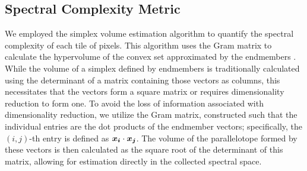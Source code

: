 \documentclass[conference,a4paper]{IEEEtran}
\newcommand{\vecb}[1]{\mbox{\boldmath$#1$}}%
\begin{document}


\subsection{Spectral Complexity Metric}
We employed the simplex volume estimation algorithm to quantify the spectral complexity of each tile of pixels. This algorithm uses the Gram matrix to calculate the hypervolume of the convex set approximated by the endmembers \cite{kostrikin_linear_1989, ziemann_using_2010, messinger_metrics_2012}. While the volume of a simplex defined by endmembers is traditionally calculated using the determinant of a matrix containing those vectors as columns, this necessitates that the vectors form a square matrix or requires dimensionality reduction to form one. To avoid the loss of information associated with dimensionality reduction, we utilize the Gram matrix, constructed such that the individual entries are the dot products of the endmember vectors; specifically, the $(i,j)$-th entry is defined as $\vecb{x_i} \cdot \vecb{x_j}$. The volume of the parallelotope formed by these vectors is then calculated as the square root of the determinant of this matrix, allowing for estimation directly in the collected spectral space.
\end{document}
